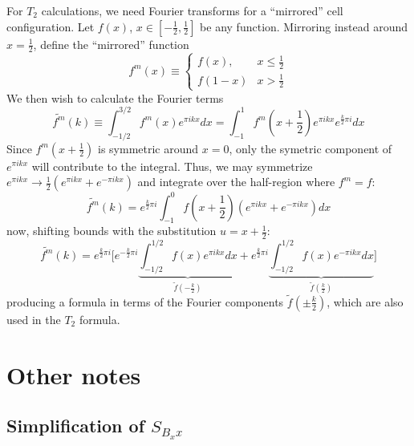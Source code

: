 \documentclass[11pt,english]{article}
\begin{document}
For $T_2$ calculations, we need Fourier transforms for a
	``mirrored'' cell configuration.
Let $f(x)$, $x \in \left[ -\frac{1}{2}, \frac{1}{2} \right]$ be any function.
Mirroring instead around $x=\frac{1}{2}$, define the ``mirrored'' function
\begin{equation}
	f^m(x) \equiv
	\begin{cases}
		f(x),		& x \leq \frac{1}{2}		\\
		f(1-x)		& x > \frac{1}{2}
	\end{cases}
\end{equation}
We then wish to calculate the Fourier terms
\begin{equation}
	\tilde {f^m}(k) \equiv \int_{-1/2}^{3/2} f^m(x) e^{\pi i k x} dx
	= \int_{-1}^{1} f^m \left( x + \frac{1}{2} \right) e^{\pi i k x}e^{\frac{k}{2} \pi i} dx
\end{equation}
Since $f^m \left( x + \frac{1}{2} \right)$ is symmetric around $x=0$,
	only the symetric component of $e^{\pi i k x}$ will contribute to the integral.
Thus, we may symmetrize $e^{\pi i k x} \rightarrow \frac{1}{2}\left(e^{\pi i k x}+e^{-\pi i k x}\right)$
and integrate over the half-region where $f^m = f$:
\begin{equation}
	\tilde {f^m}(k) = e^{\frac{k}{2} \pi i} \int_{-1}^{0} f \left( x + \frac{1}{2} \right)
	\left(e^{\pi i k x}+e^{-\pi i k x}\right) dx
\end{equation}
now, shifting bounds with the substitution $u = x+\frac{1}{2}$:
\begin{equation}
\tilde {f^m}(k) = e^{\frac{k}{2} \pi i}
	\Bigg[
		e^{-\frac{k}{2} \pi i} \underbrace{\int_{-1/2}^{1/2} f(x) e^{\pi i k x} dx}_{\tilde f \left( -\frac{k}{2} \right)}
		+e^{\frac{k}{2} \pi i} \underbrace{\int_{-1/2}^{1/2} f(x) e^{-\pi i k x} dx}_{\tilde f \left( \frac{k}{2} \right)}
	\Bigg]
\end{equation}
producing a formula in terms of the Fourier components $\tilde{f}\left( \pm \frac{k}{2} \right)$,
	which are also used in the $T_2$ formula.



\section{Other notes}

\subsection{Simplification of $S_{B_x x}$}
\end{document}
